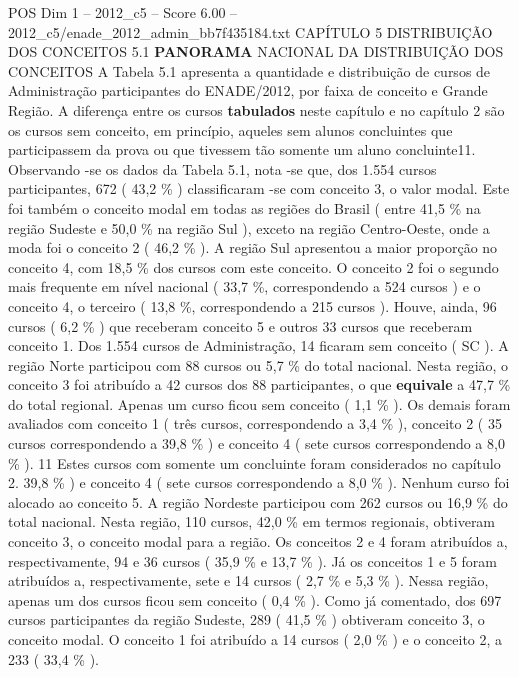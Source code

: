 \begin{textsample}{POS Dim 1 – 2012\_c5 – Score 6.00 – 2012\_c5/enade\_2012\_admin\_bb7f435184.txt}  \label{ex:f1_pos_120}
CAPÍTULO 5 DISTRIBUIÇÃO DOS CONCEITOS 5.1 \textbf{PANORAMA} NACIONAL DA DISTRIBUIÇÃO DOS CONCEITOS A Tabela 5.1 apresenta a quantidade e distribuição de cursos de Administração participantes do ENADE/2012, por faixa de conceito e Grande Região.
A diferença entre os cursos \textbf{tabulados} neste capítulo e no capítulo 2 são os cursos sem conceito, em princípio, aqueles sem alunos concluintes que participassem da prova ou que tivessem tão somente um aluno concluinte11.
Observando -se os dados da Tabela 5.1, nota -se que, dos 1.554 cursos participantes, 672 ( 43,2 \% ) classificaram -se com conceito 3, o valor modal.
Este foi também o conceito modal em todas as regiões do Brasil ( entre 41,5 \% na região Sudeste e 50,0 \% na região Sul ), exceto na região Centro-Oeste, onde a moda foi o conceito 2 ( 46,2 \% ).
A região Sul apresentou a maior proporção no conceito 4, com 18,5 \% dos cursos com este conceito.
O conceito 2 foi o segundo mais frequente em nível nacional ( 33,7 \%, correspondendo a 524 cursos ) e o conceito 4, o terceiro ( 13,8 \%, correspondendo a 215 cursos ).
Houve, ainda, 96 cursos ( 6,2 \% ) que receberam conceito 5 e outros 33 cursos que receberam conceito 1.
Dos 1.554 cursos de Administração, 14 ficaram sem conceito ( SC ).
A região Norte participou com 88 cursos ou 5,7 \% do total nacional.
Nesta região, o conceito 3 foi atribuído a 42 cursos dos 88 participantes, o que \textbf{equivale} a 47,7 \% do total regional.
Apenas um curso ficou sem conceito ( 1,1 \% ).
Os demais foram avaliados com conceito 1 ( três cursos, correspondendo a 3,4 \% ), conceito 2 ( 35 cursos correspondendo a 39,8 \% ) e conceito 4 ( sete cursos correspondendo a 8,0 \% ). 11 Estes cursos com somente um concluinte foram considerados no capítulo 2. 39,8 \% ) e conceito 4 ( sete cursos correspondendo a 8,0 \% ).
Nenhum curso foi alocado ao conceito 5.
A região Nordeste participou com 262 cursos ou 16,9 \% do total nacional.
Nesta região, 110 cursos, 42,0 \% em termos regionais, obtiveram conceito 3, o conceito modal para a região.
Os conceitos 2 e 4 foram atribuídos a, respectivamente, 94 e 36 cursos ( 35,9 \% e 13,7 \% ).
Já os conceitos 1 e 5 foram atribuídos a, respectivamente, sete e 14 cursos ( 2,7 \% e 5,3 \% ).
Nessa região, apenas um dos cursos ficou sem conceito ( 0,4 \% ).
Como já comentado, dos 697 cursos participantes da região Sudeste, 289 ( 41,5 \% ) obtiveram conceito 3, o conceito modal.
O conceito 1 foi atribuído a 14 cursos ( 2,0 \% ) e o conceito 2, a 233 ( 33,4 \% ).

\end{textsample}
